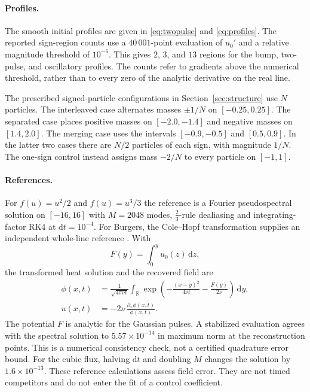 \documentclass[smallextended,nospthms]{svjour3}
\theoremstyle{plain}
\theoremstyle{definition}
\theoremstyle{remark}
\numberwithin{equation}{section}
\newcommand{\R}{\mathbb{R}}
\begin{document}
\paragraph{Profiles.}
The smooth initial profiles are given in \eqref{eq:twopulse} and \eqref{eq:profiles}.
The reported sign-region counts use a $40\,001$-point evaluation of $u_0'$
and a relative magnitude threshold of $10^{-6}$. This gives $2$, $3$, and
$13$ regions for the bump, two-pulse, and oscillatory profiles. The counts
refer to gradients above the numerical threshold, rather than to every zero
of the analytic derivative on the real line.

The prescribed signed-particle configurations in Section~\ref{sec:structure}
use $N$ particles. The interleaved case alternates masses $\pm1/N$ on
$[-0.25,0.25]$. The separated case places positive masses on $[-2.0,-1.4]$
and negative masses on $[1.4,2.0]$. The merging case uses the intervals
$[-0.9,-0.5]$ and $[0.5,0.9]$. In the latter two cases there are $N/2$
particles of each sign, with magnitude $1/N$. The one-sign control instead
assigns mass $-2/N$ to every particle on $[-1,1]$.

\paragraph{References.} For $f(u)=u^2/2$ and $f(u)=u^3/3$ the reference is a
Fourier pseudospectral solution on $[-16,16]$ with $M=2048$ modes,
$\tfrac23$-rule dealiasing and integrating-factor RK4 at $\mathrm dt=10^{-4}$.
For Burgers, the Cole--Hopf transformation supplies an independent
whole-line reference \citep{hopf1950,cole1951}. With
\[
 F(y)=\int_0^y u_0(z)\,\mathrm dz,
\]
the transformed heat solution and the recovered field are
\[
 \begin{aligned}
 \phi(x,t)&=\frac1{\sqrt{4\pi\nu t}}
   \int_\R\exp\!\left(-\frac{(x-y)^2}{4\nu t}-\frac{F(y)}{2\nu}\right)
   \,\mathrm dy,\\
 u(x,t)&=-2\nu\,\frac{\partial_x\phi(x,t)}{\phi(x,t)}.
 \end{aligned}
\]
The potential $F$ is analytic for the Gaussian pulses. A stabilized
evaluation agrees with the spectral solution to $5.57\times10^{-14}$ in
maximum norm at the reconstruction points. This is a numerical consistency
check, not a certified quadrature error bound. For the cubic flux, halving
$\mathrm dt$ and doubling $M$ changes the solution by $1.6\times10^{-13}$.
These reference calculations assess field error. They are not timed
competitors and do not enter the fit of a control coefficient.
\end{document}
